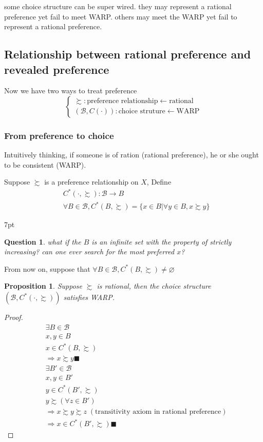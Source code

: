 \documentclass{article}
\newenvironment{redblock}{
\def\FrameCommand{
  \hspace{1pt}
    {\color{LightCoral}
    \vrule width 2pt}
    {\color{redshade}
    \vrule width 4pt}
  \colorbox{redshade}
}
\MakeFramed{
  \advance
  \hsize-
  \width
  \FrameRestore}
\noindent\hspace{-4.55pt}%
\begin{adjustwidth}{}{7pt}
\vspace{2pt}\vspace{2pt}
}
{\vspace{2pt}\end{adjustwidth}\endMakeFramed}
\newtheorem{question}{Question}
\newtheorem{proposition}{Proposition}
\begin{document}
some choice structure can be super wired. they may represent a rational preference yet fail to meet WARP. others may meet the WARP yet fail to represent a rational preference.

\subsection{Relationship between rational preference and revealed preference}
Now we have two ways to treat preference
$$\begin{cases}
\succsim: \text{preference relationship} \leftarrow \text{rational} \\
(\mathscr{B},C(\cdot)):\text{choice struture} \leftarrow \text{WARP}
\end{cases}$$

\subsubsection{From preference to choice}
Intuitively thinking, if someone is of ration (rational preference), he or she ought to be consistent (WARP). 

Suppose $\succsim$ is a preference relationship on $X$,
Define 
\begin{align}
&C^{*}(\cdot,\succsim):\mathscr{B} \rightarrow B
\\&\forall B \in \mathscr{B}, C^{*}(B,\succsim)=\{x\in B| \forall y \in B,x\succsim y  \}
\end{align}


\begin{redblock}
\begin{question}
what if the $B$ is an infinite set with the property of strictly increasing? can one ever search for the most preferred $x$? 
\end{question}
\end{redblock}

From now on, suppose that $\forall B \in \mathscr{B}, C^{*}(B,\succsim)\neq \varnothing$  

\begin{proposition}
Suppose $\succsim$ is rational, then the choice structure $(\mathscr{B},C^{*}(\cdot, \succsim))$ satisfies WARP.
\end{proposition}

\begin{proof}
\begin{align}
&\exists B\in \mathscr{B}
\\&x,y\in B 
\\&x\in C^{*}(B,\succsim)
\\& \Rightarrow x\succsim y \blacksquare
\\& \exists B'\in \mathscr{B}
\\&x,y\in B'
\\&y\in C^{*}(B',\succsim)
\\&y\succsim (\forall z\in B')
\\& \Rightarrow x\succsim y \succsim z \;(\text{transitivity axiom in rational preference})
\\& \Rightarrow x\in C^{*}(B',\succsim) \blacksquare
\end{align}
\end{proof}
\end{document}
